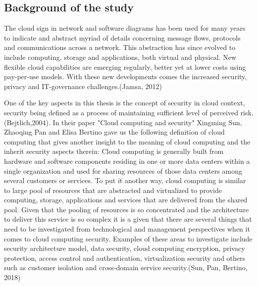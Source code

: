 \documentclass{article}
\begin{document}
\subsection{Background of the study}
The cloud sign in network and software diagrams has been used for many years to indicate and abstract myriad of details concerning message flows, protocols and communications across a network. This abstraction has since evolved to include computing, storage and applications, both virtual and physical. New flexible cloud capabilities are emerging regularly, better yet at lower costs using pay-per-use models. With these new developments comes the increased security, privacy and IT-governance challenges.(Jamsa, 2012)
\par
One of the key aspects in this thesis is the concept of security in cloud context, security being defined as a process of maintaining sufficient level of perceived risk.(Bejtlich,2004).
In their paper "Cloud computing and security" Xingming Sun, Zhaoqing Pan and Elisa Bertino gave us the following definition of cloud computing that gives another insight to the meaning of cloud computing and the inherit security aspects therein: Cloud computing is generally built from hardware and software components residing in one or more data centers within a single organization and used for sharing resources of those data centers among several customers or services. To put it another way, cloud computing is similar to large pool of resources that are abstracted and virtualized to provide computing, storage, applications and services that are delivered from the shared pool. Given that the pooling of resources is so concentrated and the architecture to deliver this service is so complex it is a given that there are several things that need to be investigated from technological and management perspectives when it comes to cloud computing security. Examples of these areas to investigate include security architecture model, data security, cloud computing encryption, privacy protection, access control and authentication, virtualization security and others such as customer isolation and cross-domain service security.(Sun, Pan, Bertino, 2018)
\par 
\end{document}
